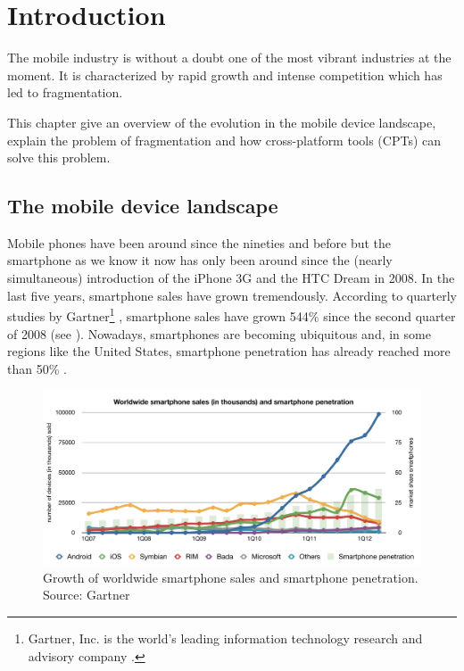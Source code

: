 \chapter{Introduction}
\label{cha:intro}


The mobile industry is without a doubt one of the most vibrant industries at the moment. It is characterized by rapid growth and intense competition which has led to fragmentation. 

This chapter give an overview of the evolution in the mobile device landscape, explain the problem of fragmentation and how cross-platform tools (CPTs) can solve this problem.

\section{The mobile device landscape}

Mobile phones have been around since the nineties and before but the smartphone as we know it now has only been around since the (nearly simultaneous) introduction of the iPhone 3G and the HTC Dream in 2008. In the last five years, smartphone sales have grown tremendously. According to quarterly studies by Gartner\footnote{Gartner, Inc. is the world's leading information technology research and advisory company \cite{Gartner}.} \citeGartner, smartphone sales have grown 544\% since the second quarter of 2008 (see ). Nowadays, smartphones are becoming ubiquitous and, in some regions like the United States, smartphone penetration has already reached more than 50\% \cite{Nielsen:2012}. 

\begin{figure}[h!]
    \begin{center}
        \includegraphics[width=\textwidth]{figs/smartphone_sales.pdf}
        	\caption{
        	    Growth of worldwide smartphone sales and smartphone penetration.\newline
        	    Source: Gartner \citeGartner
        	}
        	\label{fig:smartphone-sales}
    \end{center}
\end{figure}

